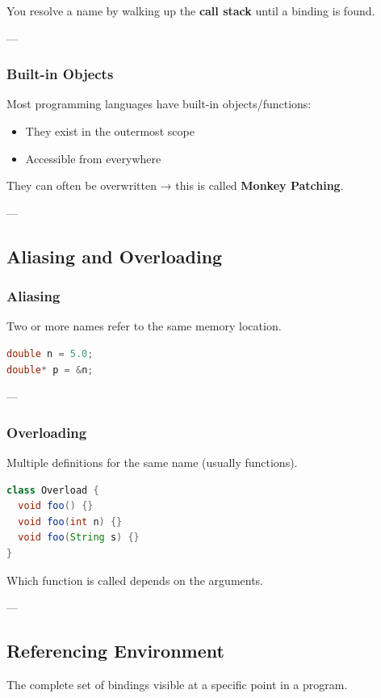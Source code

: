 \documentclass{article}
\begin{document}
You resolve a name by walking up the \textbf{call stack} until a binding is found.

---

\subsubsection{Built-in Objects}
Most programming languages have built-in objects/functions:
\begin{itemize}
  \item They exist in the outermost scope
  \item Accessible from everywhere
\end{itemize}

They can often be overwritten → this is called \textbf{Monkey Patching}.

---

\subsection{Aliasing and Overloading}

\subsubsection{Aliasing}
Two or more names refer to the same memory location.

\begin{lstlisting}[language=C]
double n = 5.0;
double* p = &n;
\end{lstlisting}

---

\subsubsection{Overloading}
Multiple definitions for the same name (usually functions).

\begin{lstlisting}[language=Java]
class Overload {
  void foo() {}
  void foo(int n) {}
  void foo(String s) {}
}
\end{lstlisting}

Which function is called depends on the arguments.

---

\subsection{Referencing Environment}
The complete set of bindings visible at a specific point in a program.
\end{document}
